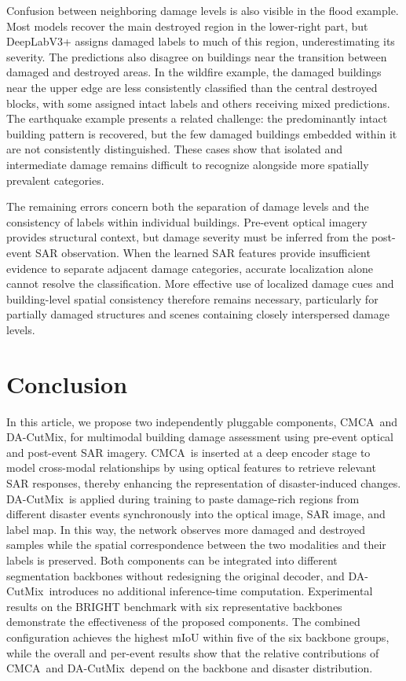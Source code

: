 \documentclass[journal]{IEEEtran}
\newcommand{\cmca}{CMCA}
\newcommand{\dacutmix}{DA-CutMix}
\begin{document}
    Confusion between neighboring damage levels is also visible in the flood example. Most models recover the main destroyed region in the lower-right part, but DeepLabV3+ assigns damaged labels to much of this region, underestimating its severity. The predictions also disagree on buildings near the transition between damaged and destroyed areas. In the wildfire example, the damaged buildings near the upper edge are less consistently classified than the central destroyed blocks, with some assigned intact labels and others receiving mixed predictions. The earthquake example presents a related challenge: the predominantly intact building pattern is recovered, but the few damaged buildings embedded within it are not consistently distinguished. These cases show that isolated and intermediate damage remains difficult to recognize alongside more spatially prevalent categories.
    
    The remaining errors concern both the separation of damage levels and the consistency of labels within individual buildings. Pre-event optical imagery provides structural context, but damage severity must be inferred from the post-event SAR observation. When the learned SAR features provide insufficient evidence to separate adjacent damage categories, accurate localization alone cannot resolve the classification. More effective use of localized damage cues and building-level spatial consistency therefore remains necessary, particularly for partially damaged structures and scenes containing closely interspersed damage levels.
    
    \FloatBarrier
    \section{Conclusion}
    \label{sec:conclusion}
    
    In this article, we propose two independently pluggable components, \cmca\ and \dacutmix, for multimodal building damage assessment using pre-event optical and post-event SAR imagery. \cmca\ is inserted at a deep encoder stage to model cross-modal relationships by using optical features to retrieve relevant SAR responses, thereby enhancing the representation of disaster-induced changes. \dacutmix\ is applied during training to paste damage-rich regions from different disaster events synchronously into the optical image, SAR image, and label map. In this way, the network observes more damaged and destroyed samples while the spatial correspondence between the two modalities and their labels is preserved. Both components can be integrated into different segmentation backbones without redesigning the original decoder, and \dacutmix\ introduces no additional inference-time computation. Experimental results on the BRIGHT benchmark with six representative backbones demonstrate the effectiveness of the proposed components. The combined configuration achieves the highest mIoU within five of the six backbone groups, while the overall and per-event results show that the relative contributions of \cmca\ and \dacutmix\ depend on the backbone and disaster distribution.
    
\end{document}
